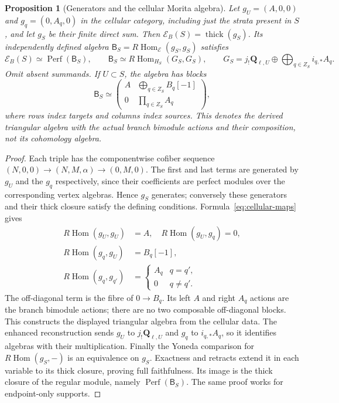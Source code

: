 \documentclass[11pt]{article}
\newtheorem{proposition}{Proposition}[section]
\theoremstyle{definition}
\theoremstyle{remark}
\newcommand{\RHom}{R\operatorname{Hom}}
\newcommand{\Perf}{\operatorname{Perf}}
\begin{document}
\begin{proposition}[Generators and the cellular Morita algebra]
\label{thm:cellular-morita}
Let $g_U=(A,0,0)$ and $g_q=(0,A_q,0)$ in the cellular category,
including just the strata present in $S$, and let $g_S$ be their
finite direct sum.  Then $\mathcal E_B(S)=\operatorname{thick}(g_S)$.
Its independently defined algebra $\mathsf B_S=\RHom_{\mathcal E}(g_S,g_S)$
satisfies
\[
 \mathcal E_B(S)\simeq\Perf(\mathsf B_S),\qquad
 \mathsf B_S\simeq\RHom_{H_S}(G_S,G_S),\qquad
 G_S=j_!\mathbf Q_{\ell,U}\oplus\bigoplus_{q\in Z_S}i_{q,*}A_q.
\]
Omit absent summands.  If $U\subset S$, the algebra has blocks
\[
 \mathsf B_S\simeq
 \begin{pmatrix}
 A&\displaystyle\bigoplus_{q\in Z_S}B_q[-1]\\
 0&\displaystyle\prod_{q\in Z_S}A_q
 \end{pmatrix},
\]
where rows index targets and columns index sources.  This denotes
the derived triangular algebra with the actual branch bimodule
actions and their composition, not its cohomology algebra.
\end{proposition}
\begin{proof}
Each triple has the componentwise cofiber sequence
$(N,0,0)\to(N,M,\alpha)\to(0,M,0)$.
The first and last terms are generated by $g_U$ and the $g_q$
respectively, since their coefficients are perfect modules over the
corresponding vertex algebras.  Hence $g_S$ generates; conversely
these generators and their thick closure satisfy the defining
conditions.  Formula~\eqref{eq:cellular-maps} gives
\[
 \begin{aligned}
  \RHom(g_U,g_U)&=A,\quad \RHom(g_U,g_q)=0,\\
  \RHom(g_q,g_U)&=B_q[-1],\\
  \RHom(g_q,g_{q'})&=\begin{cases}A_q&q=q',\\0&q\ne q'.\end{cases}
 \end{aligned}
\]
The off-diagonal term is the fibre of $0\to B_q$.
Its left $A$ and right $A_q$ actions are the branch bimodule actions;
there are no two composable off-diagonal blocks.  This constructs
the displayed triangular algebra from the cellular data.
The enhanced reconstruction sends $g_U$ to $j_!\mathbf Q_{\ell,U}$ and $g_q$ to
$i_{q,*}A_q$, so it identifies algebras with their multiplication.
Finally the Yoneda comparison for $\RHom(g_S,-)$ is an equivalence
on $g_S$.  Exactness and retracts extend it in each variable to its
thick closure, proving full faithfulness.  Its image is the thick
closure of the regular module, namely $\Perf(\mathsf B_S)$.
The same proof works for endpoint-only supports.
\end{proof}
\end{document}
